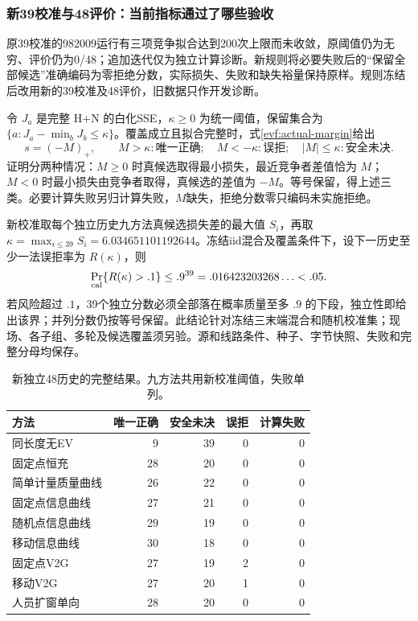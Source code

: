 \subsubsection{新39校准与48评价：当前指标通过了哪些验收}
原39校准的982009运行有三项竞争拟合达到200次上限而未收敛，原阈值仍为无穷、评价仍为0/48；追加迭代仅为独立计算诊断。新规则将必要失败后的“保留全部候选”准确编码为零拒绝分数，实际损失、失败和缺失裕量保持原样。规则冻结后改用新的39校准及48评价，旧数据只作开发诊断。

令 $J_a$ 是完整 H+N 的白化SSE，$\kappa\ge0$ 为统一阈值，保留集合为 $\{a:J_a-\min_bJ_b\le\kappa\}$。覆盖成立且拟合完整时，式\eqref{evf:actual-margin}给出
\begin{equation}
 \boxed{s=(-M)_+,\qquad
 M>\kappa:\text{唯一正确};\quad M<-\kappa:\text{误拒};\quad
 |M|\le\kappa:\text{安全未决}.}
 \label{evf:calibrated-margin}
\end{equation}
证明分两种情况：$M\ge0$ 时真候选取得最小损失，最近竞争者差值恰为 $M$；$M<0$ 时最小损失由竞争者取得，真候选的差值为 $-M$。等号保留，得上述三类。必要计算失败另归计算失败，$M$缺失，拒绝分数零只编码未实施拒绝。

新校准取每个独立历史九方法真候选损失差的最大值 $S_i$，再取 $\kappa=\max_{i\le39}S_i=6.034651101192644$。冻结iid混合及覆盖条件下，设下一历史至少一法误拒率为 $R(\kappa)$，则
\begin{equation}
 \Pr_{\rm cal}\{R(\kappa)>.1\}\le.9^{39}=.016423203268\ldots<.05.
 \label{evf:tolerance}
\end{equation}
若风险超过 $.1$，39个独立分数必须全部落在概率质量至多 $.9$ 的下段，独立性即给出该界；并列分数仍按等号保留。此结论针对冻结三末端混合和随机校准集；现场、各子组、多轮及候选覆盖须另验。源和线路条件、种子、字节快照、失败和完整分母均保存。

\begin{table}[htbp]
 \centering\small
 \caption{新独立48历史的完整结果。九方法共用新校准阈值，失败单列。}
 \label{evf:formal48}
 \begin{tabular}{lrrrr}
 \toprule
 方法 & 唯一正确 & 安全未决 & 误拒 & 计算失败\\
 \midrule
同长度无EV & 9 & 39 & 0 & 0\\
固定点恒充 & 28 & 20 & 0 & 0\\
简单计量质量曲线 & 26 & 22 & 0 & 0\\
固定点信息曲线 & 27 & 21 & 0 & 0\\
随机点信息曲线 & 29 & 19 & 0 & 0\\
移动信息曲线 & 30 & 18 & 0 & 0\\
固定点V2G & 27 & 19 & 2 & 0\\
移动V2G & 27 & 20 & 1 & 0\\
人员扩窗单向 & 28 & 20 & 0 & 0\\
\bottomrule
 \end{tabular}
\end{table}

